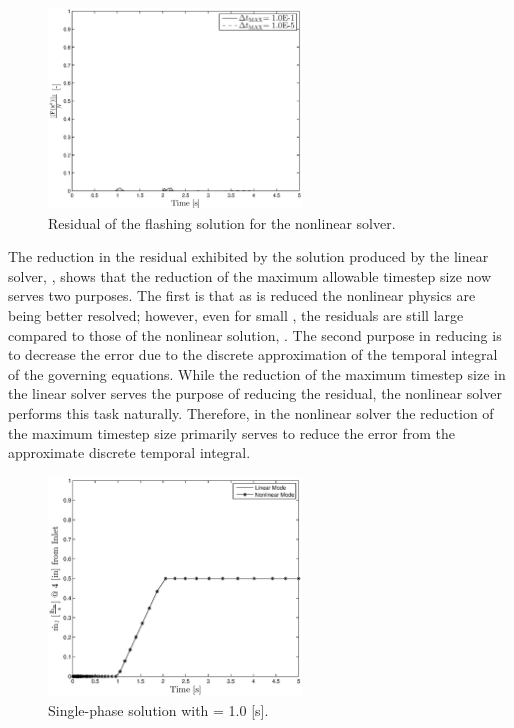 \begin{figure}[h!tb]
\centering
\includegraphics[width=0.6\textwidth]{plots/nln_flashing_res_compare.eps}
\caption{Residual of the flashing solution for the nonlinear solver.}
\label{fig:nonlinear_flashing_residual}
\end{figure}

The reduction in the residual exhibited by the solution produced by the linear solver, , shows that the reduction of the maximum allowable timestep size now serves two purposes.
The first is that as \dtmax{} is reduced the nonlinear physics are being better resolved; however, even for small \dtmax{}, the residuals are still large compared to those of the nonlinear solution, .
The second purpose in reducing \dtmax{} is to decrease the error due to the discrete approximation of the temporal integral of the governing equations.
While the reduction of the maximum timestep size in the linear solver serves the purpose of reducing the residual, the nonlinear solver performs this task naturally.
Therefore, in the nonlinear solver the reduction of the maximum timestep size primarily serves to reduce the error from the approximate discrete temporal integral.

\begin{figure}[h!tb]
\centering
\includegraphics[width=0.6\textwidth]{plots/single_1em0.eps}
\caption{Single-phase solution with \dtmax{} = 1.0 {[s]}.}
\label{fig:single_1em1}
\end{figure}

